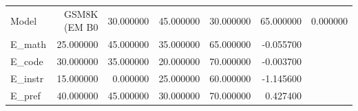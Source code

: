 \begin{tabular}{lrrrrr}
\toprule
Model & GSM8K (EM %
\midrule
B0 & 30.000000 & 45.000000 & 30.000000 & 65.000000 & 0.000000 \\
E_math & 25.000000 & 45.000000 & 35.000000 & 65.000000 & -0.055700 \\
E_code & 30.000000 & 35.000000 & 20.000000 & 70.000000 & -0.003700 \\
E_instr & 15.000000 & 0.000000 & 25.000000 & 60.000000 & -1.145600 \\
E_pref & 40.000000 & 45.000000 & 30.000000 & 70.000000 & 0.427400 \\
\bottomrule
\end{tabular}
